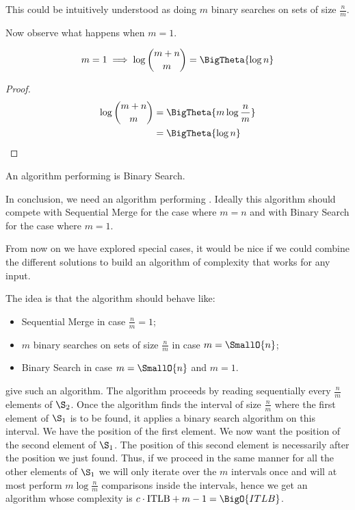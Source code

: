 This could be intuitively understood as doing $m$ binary searches on sets of
size $\frac{n}{m}$.


Now observe what happens when $m = 1$.

\begin{lemma}
\begin{align*}
m = 1 &\implies \log\binom{m+n}{m} = \BigTheta{\log n}\\
\end{align*}
\end{lemma}

\begin{proof}
\begin{align*}
\log\binom{m+n}{m} &= \BigTheta{m \log\frac{n}{m}}\\
&= \BigTheta{\log n}\\
\end{align*}
\end{proof}

An algorithm performing  is Binary Search.


In conclusion, we need an algorithm performing .
Ideally this algorithm should compete with Sequential Merge for the case where
$m = n$ and with Binary Search for the case where $m = 1$.


From now on we have explored special cases, it would be nice if we could
combine the different solutions to build an algorithm of complexity  that works for any input.

The idea is that the algorithm should behave like:

\begin{itemize}
\item Sequential Merge in case $\frac{n}{m} = 1$;
\item $m$ binary searches on sets of size $\frac{n}{m}$ in case $m = \SmallO{n}$;
\item Binary Search in case \(m = \SmallO{n}\) and \(m = 1\).
\end{itemize}

\citet*{DBLP:journals/siamcomp/HwangL72} give such an algorithm.
The algorithm proceeds by reading sequentially every $\frac{n}{m}$ elements of
$\S_2$. Once the algorithm finds the interval of size $\frac{n}{m}$ where the
first element of $\S_1$ is to be found, it applies a binary search algorithm on
this interval. We have the position of the first element.
We now want the position of the second element of $\S_1$. The position of this
second element is necessarily after the position we just found. Thus, if we
proceed in the same manner for all the other elements of $\S_1$ we will only
iterate over the $m$ intervals once and will at most perform $m
\log\frac{n}{m}$ comparisons inside the intervals, hence we get an algorithm
whose complexity is $c \cdot \text{ITLB} + m - 1 = \BigO{ITLB}$.

